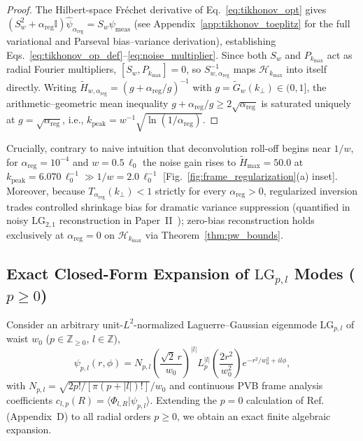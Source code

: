 \documentclass[aps,pra,reprint,nofootinbib,floatfix,longbibliography]{revtex4-2}
\theoremstyle{remark}
\newcommand{\braket}[2]{\langle #1 | #2 \rangle}
\newcommand{\abs}[1]{\lvert #1 \rvert}
\begin{document}
\begin{proof}
The Hilbert-space Fr\'echet derivative of Eq.~\eqref{eq:tikhonov_opt} gives $(S_w^2 + \alpha_{\mathrm{reg}}\mathbb{I})\hat{\psi}_{\alpha_{\mathrm{reg}}} = S_w\psi_{\mathrm{meas}}$ (see Appendix~\ref{app:tikhonov_toeplitz} for the full variational and Parseval bias--variance derivation), establishing Eqs.~\eqref{eq:tikhonov_op_def}--\eqref{eq:noise_multiplier}. Since both $S_w$ and $P_{k_{\max}}$ act as radial Fourier multipliers, $[S_w, P_{k_{\max}}] = 0$, so $S_{w,\alpha_{\mathrm{reg}}}^{-1}$ maps $\mathcal{H}_{k_{\max}}$ into itself directly. Writing $\widetilde{H}_{w,\alpha_{\mathrm{reg}}} = (g + \alpha_{\mathrm{reg}}/g)^{-1}$ with $g = \widetilde{G}_w(k_\perp) \in (0,1]$, the arithmetic--geometric mean inequality $g + \alpha_{\mathrm{reg}}/g \ge 2\sqrt{\alpha_{\mathrm{reg}}}$ is saturated uniquely at $g = \sqrt{\alpha_{\mathrm{reg}}}$, i.e., $k_{\mathrm{peak}} = w^{-1}\sqrt{\ln(1/\alpha_{\mathrm{reg}})}$.
\end{proof}

Crucially, contrary to naive intuition that deconvolution roll-off begins near $1/w$, for $\alpha_{\mathrm{reg}} = 10^{-4}$ and $w = 0.5\,\ell_0$ the noise gain rises to $\widetilde{H}_{\max} = 50.0$ at $k_{\mathrm{peak}} = 6.070\,\ell_0^{-1} \gg 1/w = 2.0\,\ell_0^{-1}$ [Fig.~\ref{fig:frame_regularization}(a) inset]. Moreover, because $T_{\alpha_{\mathrm{reg}}}(k_\perp) < 1$ strictly for every $\alpha_{\mathrm{reg}} > 0$, regularized inversion trades controlled shrinkage bias for dramatic variance suppression (quantified in noisy $\mathrm{LG}_{2,1}$ reconstruction in Paper~II~\cite{AyalaPaperII}); zero-bias reconstruction holds exclusively at $\alpha_{\mathrm{reg}} = 0$ on $\mathcal{H}_{k_{\max}}$ via Theorem~\ref{thm:pw_bounds}.

\subsection{Exact Closed-Form Expansion of \texorpdfstring{$\mathrm{LG}_{p,l}$}{LG\_\{p,l\}} Modes (\texorpdfstring{$p \ge 0$}{p >= 0})}
\label{subsec:lg_expansion}

Consider an arbitrary unit-$L^2$-normalized Laguerre--Gaussian eigenmode $\mathrm{LG}_{p,l}$ of waist $w_0$ ($p \in \mathbb{Z}_{\ge 0}$, $l \in \mathbb{Z}$),
\begin{equation}
\psi_{p,l}(r,\phi) = N_{p,l}\left(\frac{\sqrt{2}\,r}{w_0}\right)^{\abs{l}} L_p^{\abs{l}}\!\left(\frac{2r^2}{w_0^2}\right) e^{-r^2/w_0^2 + il\phi},
\label{eq:lg_def}
\end{equation}
with $N_{p,l} = \sqrt{2p!/[\pi(p+\abs{l})!]}/w_0$ and continuous PVB frame analysis coefficients $c_{l,p}(R) = \braket{\Phi_{l,R}}{\psi_{p,l}}$. Extending the $p = 0$ calculation of Ref.~\cite{Ferreira2026} (Appendix~D) to all radial orders $p \ge 0$, we obtain an exact finite algebraic expansion.
\end{document}
